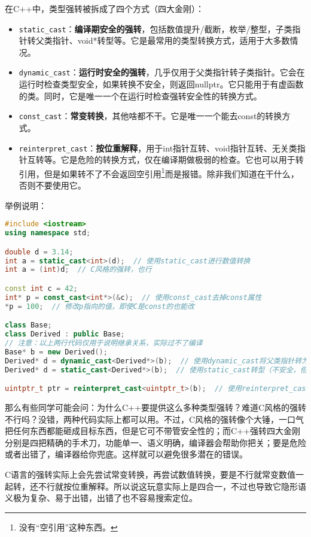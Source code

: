 \documentclass[../main.tex]{subfiles}
\begin{document}
在C++中，类型强转被拆成了四个方式（四大金刚）：
\begin{itemize}
  \item \texttt{static\_cast}：\textbf{编译期安全的强转}，包括数值提升/截断，枚举/整型，子类指针转父类指针、void*转型等。它是最常用的类型转换方式，适用于大多数情况。
  \item \texttt{dynamic\_cast}：\textbf{运行时安全的强转}，几乎仅用于父类指针转子类指针。它会在运行时检查类型安全，如果转换不安全，则返回nullptr。它只能用于有虚函数的类。同时，它是唯一一个在运行时检查强转安全性的转换方式。
  \item \texttt{const\_cast}：\textbf{常变转换}，其他啥都不干。它是唯一一个能去const的转换方式。
  \item \texttt{reinterpret\_cast}：\textbf{按位重解释}，用于int指针互转、void指针互转、无关类指针互转等。它是危险的转换方式，仅在编译期做极弱的检查。它也可以用于转引用，但是如果转不了不会返回空引用\footnote{没有“空引用”这种东西。}而是报错。除非我们知道在干什么，否则不要使用它。
\end{itemize}

举例说明：
\begin{lstlisting}[language=C++]
#include <iostream>
using namespace std;

double d = 3.14;
int a = static_cast<int>(d);  // 使用static_cast进行数值转换
int a = (int)d;  // C风格的强转，也行

const int c = 42;
int* p = const_cast<int*>(&c);  // 使用const_cast去掉const属性
*p = 100;  // 修改p指向的值，即使C是const的也能改

class Base;
class Derived : public Base;
// 注意：以上两行代码仅用于说明继承关系，实际过不了编译
Base* b = new Derived();
Derived* d = dynamic_cast<Derived*>(b);  // 使用dynamic_cast将父类指针转为子类
Derived* d = static_cast<Derived*>(b);  // 使用static_cast转型（不安全，但是能过编译）

uintptr_t ptr = reinterpret_cast<uintptr_t>(b);  // 使用reinterpret_cast将指针转换为整数
\end{lstlisting}

那么有些同学可能会问：为什么C++要提供这么多种类型强转？难道C风格的强转不行吗？没错，两种代码实际上都可以用。不过，C风格的强转像个大锤，一口气把任何东西都能砸成目标东西，但是它可不带管安全性的；而C++强转四大金刚分别是四把精确的手术刀，功能单一、语义明确，编译器会帮助你把关；要是危险或者出错了，编译器给你兜底。这样就可以避免很多潜在的错误。

C语言的强转实际上会先尝试常变转换，再尝试数值转换，要是不行就常变数值一起转，还不行就按位重解释。所以说这玩意实际上是四合一，不过也导致它隐形语义极为复杂、易于出错，出错了也不容易搜索定位。
\end{document}
